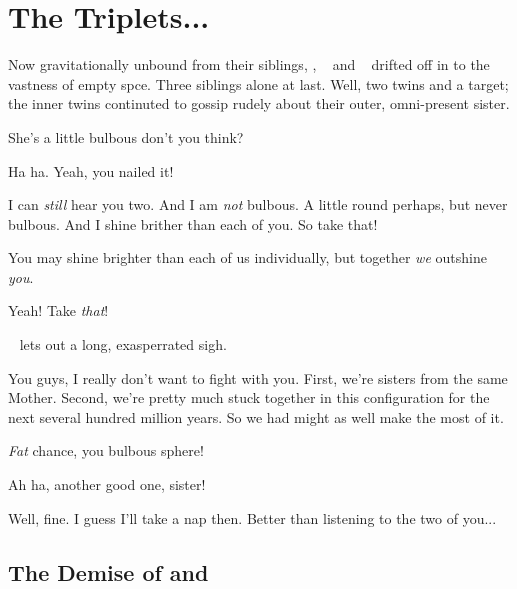\documentclass[main.tex]{subfiles}
\begin{document}
\chapter{The Triplets...}

 
\newpara \nar Now gravitationally unbound from their siblings, \rmtaygete, \rmalcyone~ and \rmcelaeno~ drifted off in to the vastness of empty spce.  Three siblings alone at last.  Well, two twins and a target; the inner twins continuted to gossip rudely about their outer, omni-present sister.

\newpara \Taygete She's a little bulbous don't you think?

\newpara \Alcyone  Ha ha.  Yeah, you nailed it!

\newpara \Celaeno  I can \textit{still} hear you two.  And I am \textit{not} bulbous.  A little round perhaps, but never bulbous.  And I shine brither than each of you.  So take that!

\newpara \Alcyone You may shine brighter than each of us individually, but together \textit{we} outshine \textit{you}.  

\newpara \Taygete Yeah!  Take \textit{that}!

\newpara \nar \rmcelaeno~ lets out a long, exasperrated sigh.

\newpara \Celaeno You guys, I really don't want to fight with you.  First, we're sisters from the same Mother.  Second, we're pretty much stuck together in this configuration for the next several hundred million years.  So we had might as well make the most of it.

\newpara \Taygete \textit{Fat} chance, you bulbous sphere!

\newpara \Alcyone Ah ha, another good one, sister!

\newpara \Celaeno Well, fine.  I guess I'll take a nap then.  Better than listening to the two of you...

\section{The Demise of \rmtaygete and \rmalcyone}
\end{document}
